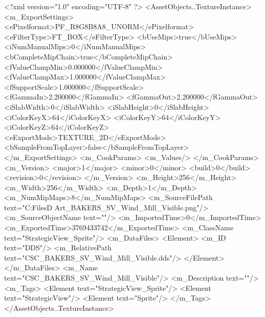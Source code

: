 <?xml version="1.0" encoding="UTF-8" ?>
<AssetObjects..TextureInstance>
	<m_ExportSettings>
		<ePixelformat>PF_R8G8B8A8_UNORM</ePixelformat>
		<eFilterType>FT_BOX</eFilterType>
		<bUseMips>true</bUseMips>
		<iNumManualMips>0</iNumManualMips>
		<bCompleteMipChain>true</bCompleteMipChain>
		<fValueClampMin>0.000000</fValueClampMin>
		<fValueClampMax>1.000000</fValueClampMax>
		<fSupportScale>1.000000</fSupportScale>
		<fGammaIn>2.200000</fGammaIn>
		<fGammaOut>2.200000</fGammaOut>
		<iSlabWidth>0</iSlabWidth>
		<iSlabHeight>0</iSlabHeight>
		<iColorKeyX>64</iColorKeyX>
		<iColorKeyY>64</iColorKeyY>
		<iColorKeyZ>64</iColorKeyZ>
		<eExportMode>TEXTURE_2D</eExportMode>
		<bSampleFromTopLayer>false</bSampleFromTopLayer>
	</m_ExportSettings>
	<m_CookParams>
		<m_Values/>
	</m_CookParams>
	<m_Version>
		<major>1</major>
		<minor>0</minor>
		<build>0</build>
		<revision>0</revision>
	</m_Version>
	<m_Height>256</m_Height>
	<m_Width>256</m_Width>
	<m_Depth>1</m_Depth>
	<m_NumMipMaps>8</m_NumMipMaps>
	<m_SourceFilePath text="C:\Users\Shadow\Desktop\Working Files\2D Art\Quarters\Bakers\StrategicView\CSC_BAKERS_SV_Wind_Mill_Visible.png"/>
	<m_SourceObjectName text=""/>
	<m_ImportedTime>0</m_ImportedTime>
	<m_ExportedTime>3769433742</m_ExportedTime>
	<m_ClassName text="StrategicView_Sprite"/>
	<m_DataFiles>
		<Element>
			<m_ID text="DDS"/>
			<m_RelativePath text="CSC_BAKERS_SV_Wind_Mill_Visible.dds"/>
		</Element>
	</m_DataFiles>
	<m_Name text="CSC_BAKERS_SV_Wind_Mill_Visible"/>
	<m_Description text=""/>
	<m_Tags>
		<Element text="StrategicView_Sprite"/>
		<Element text="StrategicView"/>
		<Element text="Sprite"/>
	</m_Tags>
</AssetObjects..TextureInstance>

